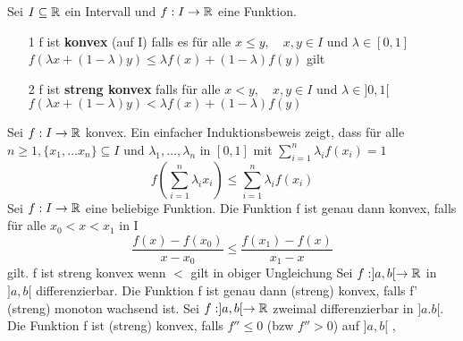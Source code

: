  Sei \(I \subseteq \mathbb{R} \) ein Intervall und \(f: I \rightarrow \mathbb{R} \) eine Funktion.
\begin{enumerate}
    \item [1] f ist \textbf{konvex} (auf I) falls es für alle \(x \leq y, \quad x,y \in I \) und \(\lambda \in [0,1]\)
    \(f(\lambda x + (1 - \lambda)y) \leq \lambda f(x) + (1 - \lambda) f(y)\) gilt
    \item [2] f ist \textbf{streng konvex} falls für alle \(x < y, \quad x,y \in I \) und \( \lambda \in ]0,1[\)
    \(f(\lambda x + (1 - \lambda)y) < \lambda f(x) + (1 - \lambda)f(y)\)
\end{enumerate}
 Sei \(f : I \rightarrow \mathbb{R} \) konvex. Ein einfacher Induktionsbeweis zeigt, dass für alle \(n \geq 1, \{x_1, \dots x_n \} \subseteq I \) und \(\lambda_1, \dots, \lambda_n\) in \([0,1]\) mit \(\sum_{i=1}^n \lambda_i f(x_i) = 1\)
\[f(\sum_{i=1}^n \lambda_i x_i) \leq \sum_{i=1}^n \lambda_i f(x_i)\]
 Sei \(f : I \rightarrow \mathbb{R} \) eine beliebige Funktion. Die Funktion f ist genau dann konvex, falls für alle \(x_0 < x < x_1 \) in I
\[ \frac{f(x) - f(x_0)}{x - x_0} \leq \frac{f(x_1) - f(x)}{x_1 - x}\]
gilt. f ist streng konvex wenn \( < \) gilt in obiger Ungleichung
 Sei \(f : ]a,b[ \rightarrow \mathbb{R} \) in \(]a,b[\) differenzierbar. Die Funktion f ist genau dann (streng) konvex, falls f' (streng) monoton wachsend ist.
 Sei \(f : ]a,b[ \rightarrow \mathbb{R} \) zweimal differenzierbar in \(]a.b[\). Die Funktion f ist (streng) konvex, falls \(f'' \leq 0\) (bzw \(f'' > 0\)) auf \(]a,b[\)
\sep
